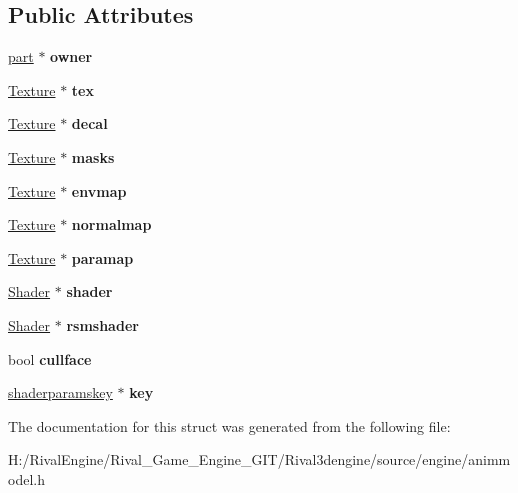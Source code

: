\subsection*{Public Attributes}
\begin{DoxyCompactItemize}
\item 
\mbox{\label{structanimmodel_1_1skin_a0bc2a4726b2b304e51647298ae278b9d}} 
\hyperlink{structanimmodel_1_1part}{part} $\ast$ {\bfseries owner}
\item 
\mbox{\label{structanimmodel_1_1skin_a9fac64446fd76c74b86c3246f03eecc2}} 
\hyperlink{struct_texture}{Texture} $\ast$ {\bfseries tex}
\item 
\mbox{\label{structanimmodel_1_1skin_a81ebcaa2d213fcf349a7fe9222dd8918}} 
\hyperlink{struct_texture}{Texture} $\ast$ {\bfseries decal}
\item 
\mbox{\label{structanimmodel_1_1skin_aa7dd83d2bf3725ce3460a8413ddd375f}} 
\hyperlink{struct_texture}{Texture} $\ast$ {\bfseries masks}
\item 
\mbox{\label{structanimmodel_1_1skin_a243952359d94b8d51345c554ce0de6b5}} 
\hyperlink{struct_texture}{Texture} $\ast$ {\bfseries envmap}
\item 
\mbox{\label{structanimmodel_1_1skin_a56a24f3d6f36e547d544c2e1c4bc769b}} 
\hyperlink{struct_texture}{Texture} $\ast$ {\bfseries normalmap}
\item 
\mbox{\label{structanimmodel_1_1skin_a2ba3326527ac8a1af9ec0c18e8097e07}} 
\hyperlink{struct_texture}{Texture} $\ast$ {\bfseries paramap}
\item 
\mbox{\label{structanimmodel_1_1skin_a6a0dde5d347dc7ec2b03285998f4bd5a}} 
\hyperlink{struct_shader}{Shader} $\ast$ {\bfseries shader}
\item 
\mbox{\label{structanimmodel_1_1skin_afd41d094b2d0fc3fdb6178efb85420cb}} 
\hyperlink{struct_shader}{Shader} $\ast$ {\bfseries rsmshader}
\item 
\mbox{\label{structanimmodel_1_1skin_a9f09a47f0711a0ba7cbe7fb7fe26c9b8}} 
bool {\bfseries cullface}
\item 
\mbox{\label{structanimmodel_1_1skin_abec87717e1ef8b71f5ac3e16196a47b1}} 
\hyperlink{structanimmodel_1_1shaderparamskey}{shaderparamskey} $\ast$ {\bfseries key}
\end{DoxyCompactItemize}


The documentation for this struct was generated from the following file\+:\begin{DoxyCompactItemize}
\item 
H\+:/\+Rival\+Engine/\+Rival\+\_\+\+Game\+\_\+\+Engine\+\_\+\+G\+I\+T/\+Rival3dengine/source/engine/animmodel.\+h\end{DoxyCompactItemize}
